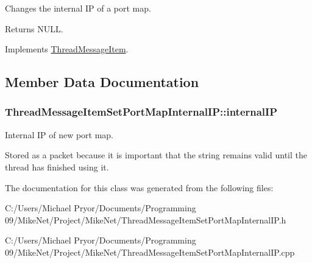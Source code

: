 Changes the internal IP of a port map. 

\begin{DoxyReturn}{Returns}
NULL. 
\end{DoxyReturn}


Implements \hyperlink{class_thread_message_item_ae09a47834e313524b19700ebc92b0dfe}{ThreadMessageItem}.



\subsection{Member Data Documentation}
\hypertarget{class_thread_message_item_set_port_map_internal_i_p_affffbd207f88ef6e0df40e7c1103d22e}{
\subsubsection[{internalIP}]{ {\bf ThreadMessageItemSetPortMapInternalIP::internalIP}}}
\label{class_thread_message_item_set_port_map_internal_i_p_affffbd207f88ef6e0df40e7c1103d22e}


Internal IP of new port map. 

Stored as a packet because it is important that the string remains valid until the thread has finished using it. 

The documentation for this class was generated from the following files:\begin{DoxyCompactItemize}
\item 
C:/Users/Michael Pryor/Documents/Programming 09/MikeNet/Project/MikeNet/ThreadMessageItemSetPortMapInternalIP.h\item 
C:/Users/Michael Pryor/Documents/Programming 09/MikeNet/Project/MikeNet/ThreadMessageItemSetPortMapInternalIP.cpp\end{DoxyCompactItemize}
